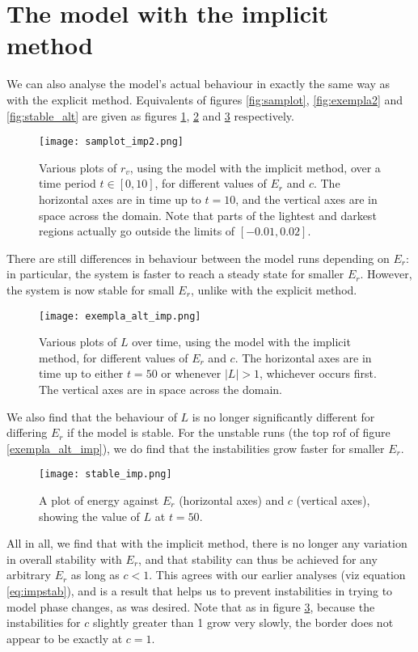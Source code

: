 \documentclass[11pt]{article}
\begin{document}
\section{The model with the implicit method}
We can also analyse the model's actual behaviour in exactly the same way as with the explicit method. Equivalents of figures \ref{fig:samplot}, \ref{fig:exempla2} and \ref{fig:stable_alt} are given as figures \ref{fig:samplot_imp2}, \ref{fig:exempla_alt_imp} and \ref{fig:stable_imp} respectively.
\begin{figure}[H]
\centering
\texttt{[image: samplot\_imp2.png]}
\caption{Various plots of $r_v$, using the model with the implicit method, over a time period $t\in[0,10]$, for different values of $E_r$ and $c$. The horizontal axes are in time up to $t=10$, and the vertical axes are in space across the domain. Note that parts of the lightest and darkest regions actually go outside the limits of $[-0.01,0.02]$.}
\label{fig:samplot_imp2}
\end{figure}
There are still differences in behaviour between the model runs depending on $E_r$: in particular, the system is faster to reach a steady state for smaller $E_r$. However, the system is now stable for small $E_r$, unlike with the explicit method.
\begin{figure}[H]
\centering
\texttt{[image: exempla\_alt\_imp.png]}
\caption{Various plots of $L$ over time, using the model with the implicit method, for different values of $E_r$ and $c$. The horizontal axes are in time up to either $t=50$ or whenever $|L|>1$, whichever occurs first. The vertical axes are in space across the domain.}
\label{fig:exempla_alt_imp}
\end{figure}
We also find that the behaviour of $L$ is no longer significantly different for differing $E_r$ if the model is stable. For the unstable runs (the top rof of figure \ref{exempla_alt_imp}), we do find that the instabilities grow faster for smaller $E_r$.
\begin{figure}[H]
\centering
\texttt{[image: stable\_imp.png]}
\caption{A plot of energy against $E_r$ (horizontal axes) and $c$ (vertical axes), showing the value of $L$ at $t=50$.}
\label{fig:stable_imp}
\end{figure}
All in all, we find that with the implicit method, there is no longer any variation in overall stability with $E_r$, and that stability can thus be achieved for any arbitrary $E_r$ as long as $c<1$. This agrees with our earlier analyses (viz equation \ref{eq:impstab}), and is a result that helps us to prevent instabilities in trying to model phase changes, as was desired.
Note that as in figure \ref{fig:stable_imp}, because the instabilities for $c$ slightly greater than 1 grow very slowly, the border does not appear to be exactly at $c=1$.
\end{document}
